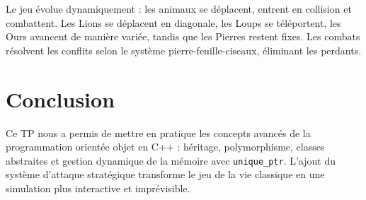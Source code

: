 \documentclass[a4paper,12pt,french]{article}
\begin{document}
Le jeu évolue dynamiquement : les animaux se déplacent, entrent en collision et combattent. Les Lions se déplacent en diagonale, les Loups se téléportent, les Ours avancent de manière variée, tandis que les Pierres restent fixes. Les combats résolvent les conflits selon le système pierre-feuille-ciseaux, éliminant les perdants.

\section{Conclusion}

Ce TP nous a permis de mettre en pratique les concepts avancés de la programmation orientée objet en C++ : héritage, polymorphisme, classes abstraites et gestion dynamique de la mémoire avec \texttt{unique\_ptr}. L'ajout du système d'attaque stratégique transforme le jeu de la vie classique en une simulation plus interactive et imprévisible.
\end{document}
